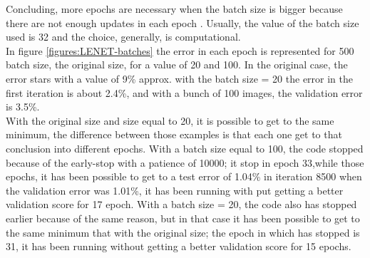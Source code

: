 Concluding, more epochs are necessary when the batch size is bigger because there are not enough updates in each epoch \cite{Yoshua}. Usually, the value of the batch size used is 32 \cite{Yoshua} and the choice, generally, is computational.\\

In figure \ref{figures:LENET-batches} the error in each epoch is represented  for 500 batch size, the original size, for a value of 20 and 100. In the original case, the error stars with a value of 9\% approx. with the batch size = 20 the error in the first iteration is about 2.4\%, and with a bunch of 100 images, the validation error is 3.5\%.\\

With the original size and size equal to 20, it is possible to get to the same minimum, the difference between those examples is that each one get to that conclusion into different epochs. With a batch size equal to 100, the code stopped because of the early-stop with a patience of 10000; it stop in epoch 33,while those epochs, it has been possible to get to a test error of 1.04\% in iteration 8500 when the validation error was 1.01\%, it has been running with put getting a better validation score for 17 epoch. With a batch size = 20, the code also has stopped earlier because of the same reason, but in that case it has been possible to get to the same minimum that with the original size; the epoch in which has stopped is 31, it has been running without getting a better validation score for 15 epochs.\\




